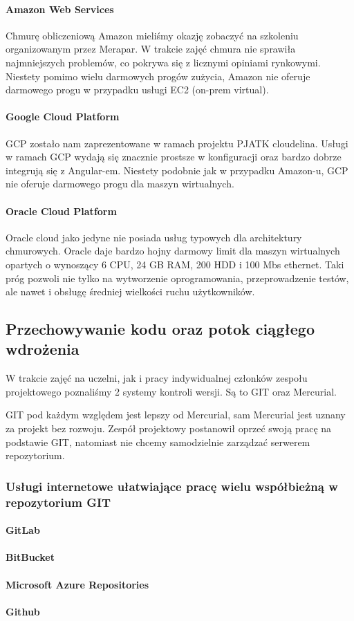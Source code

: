 \paragraph{Amazon Web Services}
Chmurę obliczeniową Amazon mieliśmy okazję zobaczyć na szkoleniu organizowanym przez Merapar.
W trakcie zajęć chmura nie sprawiła najmniejszych problemów, co pokrywa się z licznymi opiniami rynkowymi.
Niestety pomimo wielu darmowych progów zużycia, Amazon nie oferuje darmowego progu w przypadku usługi EC2 (\gls{on-prem} virtual).

\paragraph{Google Cloud Platform}
GCP zostało nam zaprezentowane w ramach projektu PJATK cloudelina.
Usługi w ramach GCP wydają się znacznie prostsze w konfiguracji oraz bardzo dobrze integrują się z Angular-em.
Niestety podobnie jak w przypadku Amazon-u, GCP nie oferuje darmowego progu dla maszyn wirtualnych.

\paragraph{Oracle Cloud Platform}
Oracle cloud jako jedyne nie posiada usług typowych dla architektury chmurowych.
Oracle daje bardzo hojny darmowy limit dla maszyn wirtualnych opartych o  wynoszący 6 CPU, 24 GB RAM, 200 HDD i 100 Mbs ethernet.
Taki próg pozwoli nie tylko na wytworzenie oprogramowania, przeprowadzenie testów, ale nawet i obsługę średniej wielkości ruchu użytkowników.

\subsection{Przechowywanie kodu oraz potok ciągłego wdrożenia}
\label{subsec:przechowywanie-kodu-oraz-potok-ciagego-wdrozenia}

W trakcie zajęć na uczelni, jak i pracy indywidualnej członków zespołu projektowego poznaliśmy 2 systemy kontroli wersji.
Są to GIT oraz Mercurial.

GIT pod każdym względem jest lepszy od Mercurial, sam Mercurial jest uznany za projekt bez rozwoju.
Zespół projektowy postanowił oprzeć swoją pracę na podstawie GIT, natomiast nie chcemy samodzielnie zarządzać serwerem repozytorium.

\subsubsection{Usługi internetowe ułatwiające pracę wielu współbieżną w repozytorium GIT}
\paragraph{GitLab}
\paragraph{BitBucket}
\paragraph{Microsoft Azure Repositories}
\paragraph{Github}
